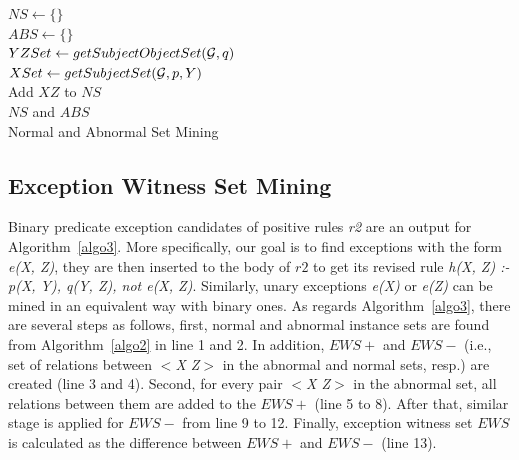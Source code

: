 \IncMargin{1.5em}
\begin{algorithm}[H]
\DontPrintSemicolon
\SetAlgoLined
{}
\BlankLine
$NS \leftarrow \{\}$\\
$ABS \leftarrow \{\}$\\
$YZSet \leftarrow getSubjectObjectSet(\mathcal{G}, q)$\\
\BlankLine
{} {
    \BlankLine
	$XSet \leftarrow getSubjectSet(\mathcal{G}, p, Y)$\\
	 {
	 {
		Add $XZ$ to $NS$\\
	}
	}
}
\BlankLine
\Return $NS$ and $ABS$\\
\caption{Normal and Abnormal Set Mining}
\label{algo2}
\end{algorithm}
\DecMargin{1.5em}

\subsection{Exception Witness Set Mining}

Binary predicate exception candidates of positive rules \textit{r2} are an output for Algorithm~\ref{algo3}. More specifically, our goal is to find exceptions with the form \textit{e(X, Z)}, they are then inserted to the body of $r2$ to get its revised rule \textit{h(X, Z) :- p(X, Y), q(Y, Z), not e(X, Z)}. Similarly, unary exceptions \textit{e(X)} or \textit{e(Z)} can be mined in an equivalent way with binary ones. As regards Algorithm~\ref{algo3}, there are several steps as follows, first, normal and abnormal instance sets are found from Algorithm~\ref{algo2} in line 1 and 2. In addition, $EWS+$ and $EWS-$ (i.e., set of relations between \textit{$<$X Z$>$} in the abnormal and normal sets, resp.) are created (line 3 and 4). Second, for every pair \textit{$<$X Z$>$} in the abnormal set, all relations between them are added to the $EWS+$ (line 5 to 8). After that, similar stage is applied for $EWS-$ from line 9 to 12. Finally, exception witness set $EWS$ is calculated as the difference between $EWS+$ and $EWS-$ (line 13).

